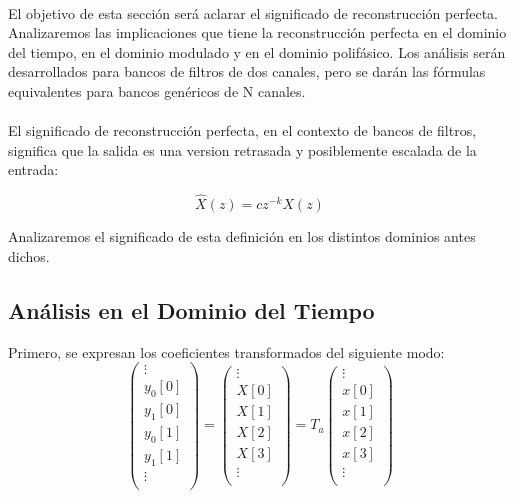 \paragraph{}
El objetivo de esta sección será aclarar el significado de reconstrucción perfecta. Analizaremos las implicaciones que tiene la reconstrucción perfecta en el dominio del tiempo, en el dominio modulado y en el dominio polifásico. Los análisis serán desarrollados para bancos de filtros de dos canales, pero se darán las fórmulas equivalentes para bancos genéricos de N canales.
\paragraph{}
El significado de reconstrucción perfecta, en el contexto de bancos de filtros, significa que la salida es una version retrasada y posiblemente escalada de la entrada:

\begin{equation}
	\hat{X}(z) = c z^{-k} X(z)
	\label{eq:recons_perf}
\end{equation}

Analizaremos el significado de esta definición en los distintos dominios antes dichos.

\subsection{Análisis en el Dominio del Tiempo}


Primero, se expresan los coeficientes transformados del siguiente modo:
	\begin{equation}
		\begin{pmatrix}
			\vdots \\
			y_0[0] \\
			y_1[0] \\
			y_0[1] \\
			y_1[1] \\
			\vdots \\
		\end{pmatrix}
		=
		\begin{pmatrix}
			\vdots \\
			X[0] \\
			X[1] \\
			X[2] \\
			X[3] \\
			\vdots \\
		\end{pmatrix}
		= T_a 
		\begin{pmatrix}
			\vdots \\
			x[0] \\
			x[1] \\
			x[2] \\
			x[3] \\
			\vdots \\
		\end{pmatrix}
	\end{equation}
	

